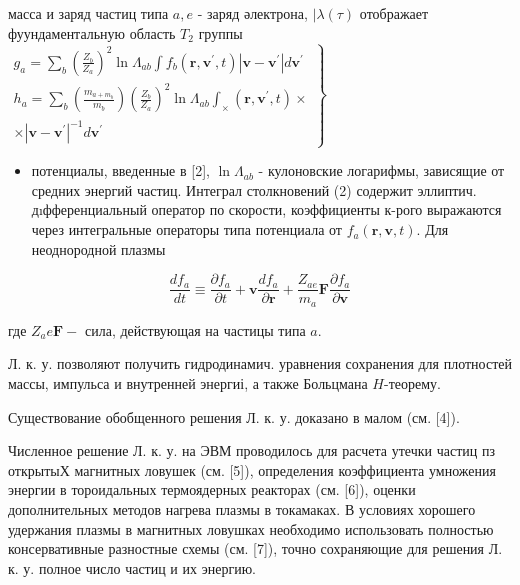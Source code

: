 \documentclass[10pt]{article}
\begin{document}
масса и заряд частиц типа $a, e$ - заряд әлектрона, $\mid \lambda(\tau)$ отображает фуундаментальную область $T_{2}$ группы $\left.\begin{array}{c}g_{a}=\sum_{b}\left(\frac{Z_{b}}{Z_{a}}\right)^{2} \ln \Lambda_{a b} \int f_{b}\left(\boldsymbol{r}, \boldsymbol{v}^{\prime}, t\right)\left|\boldsymbol{v}-\boldsymbol{v}^{\prime}\right| d \boldsymbol{v}^{\prime} \\ h_{a}=\sum_{b}\left(\frac{m_{a+m_{b}}}{m_{b}}\right)\left(\frac{Z_{b}}{Z_{a}}\right)^{2} \ln \Lambda_{a b} \int_{\times}\left(\boldsymbol{r}, \boldsymbol{v}^{\prime}, t\right) \times \\ \times\left|\boldsymbol{v}-\boldsymbol{v}^{\prime}\right|^{-1} d \boldsymbol{v}^{\prime}\end{array}\right\}$



\begin{itemize}

  \item потенциалы, введенные в [2], $\ln \Lambda_{a b}$ - кулоновские логарифмы, зависящие от средних энергий частиц. Интеграл столкновений (2) содержит эллиптич. дıфференциальный оператор по скорости, коэффициенты к-рого выражаются через интегральные операторы типа потенциала от $f_{a}(\boldsymbol{r}, \boldsymbol{v}, t)$. Для неоднородной плазмы

\end{itemize}



\[

\frac{d f_{a}}{d t} \equiv \frac{\partial f_{a}}{\partial t}+\boldsymbol{v} \frac{d f_{a}}{\partial \boldsymbol{r}}+\frac{Z_{a e}}{m_{a}} \boldsymbol{F} \frac{\partial f_{a}}{\partial \boldsymbol{v}}

\]



где $Z_{a} e \boldsymbol{F}-$ сила, действующая на частицы типа $a$.



Л. к. у. позволяют получить гидродинамич. уравнения сохранения для плотностей массы, импульса и внутренней энергиі, а также Больцмана $H$-теорему.



Существование обобщенного решения Л. к. у. доказано в малом (см. [4]).



Численное решение Л. к. у. на ЭВМ проводилось для расчета утечки частиц пз открытыХ магнитных ловушек (см. [5]), определения коэффициента умножения энергии в тороидальных термоядерных реакторах (см. [6]), оценки дополнительных методов нагрева плазмы в токамаках. В условиях хорошего удержания плазмы в магнитных ловушках необходимо использовать полностью консервативные разностные схемы (см. [7]), точно сохраняющие для решения Л. к. у. полное число частиц и их энергию.
\end{document}
